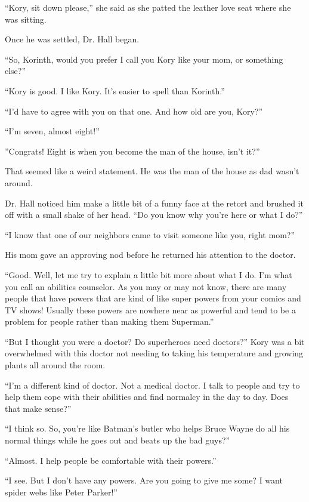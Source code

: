 \documentclass[9pt]{memoir}
\begin{document}
``Kory, sit down please,'' she said as she patted the leather love seat where she was sitting.

Once he was settled, Dr. Hall began.

``So, Korinth, would you prefer I call you Kory like your mom, or something else?''

``Kory is good. I like Kory. It's easier to spell than Korinth.''

``I'd have to agree with you on that one. And how old are you, Kory?''

``I'm seven, almost eight!''

''Congrats! Eight is when you become the man of the house, isn't it?''

That seemed like a weird statement. He was the man of the house as dad wasn't around.

Dr. Hall noticed him make a little bit of a funny face at the retort and brushed it off with a small shake of her head. ``Do you know why you're here or what I do?''

``I know that one of our neighbors came to visit someone like you, right mom?''

His mom gave an approving nod before he returned his attention to the doctor.

``Good. Well, let me try to explain a little bit more about what I do. I'm what you call an abilities counselor. As you may or may not know, there are many people that have powers that are kind of like super powers from your comics and TV shows! Usually these powers are nowhere near as powerful and tend to be a problem for people rather than making them Superman.''

``But I thought you were a doctor? Do superheroes need doctors?'' Kory was a bit overwhelmed with this doctor not needing to taking his temperature and growing plants all around the room.

``I'm a different kind of doctor. Not a medical doctor. I talk to people and try to help them cope with their abilities and find normalcy in the day to day. Does that make sense?''

``I think so. So, you're like Batman's butler who helps Bruce Wayne do all his normal things while he goes out and beats up the bad guys?''

``Almost. I help people be comfortable with their powers.''

``I see. But I don't have any powers. Are you going to give me some? I want spider webs like Peter Parker!''
\end{document}
